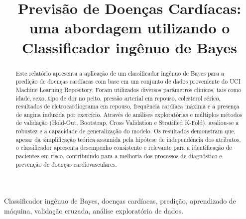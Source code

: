 \documentclass[conference]{IEEEtran}
\begin{document}
\title{Previsão de Doenças Cardíacas: uma abordagem utilizando o Classificador ingênuo de Bayes \\}

\author{
\and
{}
\and
{}
}

\maketitle

\begin{abstract}
Este relatório apresenta a aplicação de um classificador ingênuo de Bayes para a predição de doenças cardíacas com base em um conjunto de dados proveniente do UCI Machine Learning Repository. Foram utilizados diversos parâmetros clínicos, tais como idade, sexo, tipo de dor no peito, pressão arterial em repouso, colesterol sérico, resultados de eletrocardiograma em repouso, frequência cardíaca máxima e a presença de angina induzida por exercício. Através de análises exploratórias e múltiplos métodos de validação (Hold-Out, Bootstrap, Cross Validation e Stratified K-Fold), avaliou-se a robustez e a capacidade de generalização do modelo. Os resultados demonstram que, apesar da simplificação teórica assumida pela hipótese de independência dos atributos, o classificador apresenta desempenho consistente e relevante para a identificação de pacientes em risco, contribuindo para a melhoria dos processos de diagnóstico e prevenção de doenças cardiovasculares.
\end{abstract}

\begin{IEEEkeywords}
Classificador ingênuo de Bayes, doenças cardíacas, predição, aprendizado de máquina, validação cruzada, análise exploratória de dados.
\end{IEEEkeywords}
\end{document}
